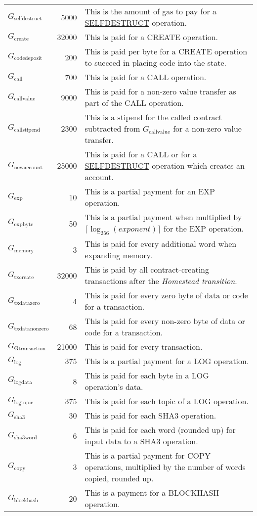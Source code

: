 \documentclass[9pt,oneside]{amsart}
\begin{document}
\begin{tabularx}{\textwidth}{lrX}
$G_{\mathrm{selfdestruct}}$ & 5000 & This is the amount of gas to pay for a \hyperlink{selfdestruct}{\small SELFDESTRUCT} operation. \\
$G_{\mathrm{create}}$ & 32000 & This is paid for a {\small CREATE} operation. \\
$G_{\mathrm{codedeposit}}$ & 200 & This is paid per byte for a {\small CREATE} operation to succeed in placing code into the state. \\
$G_{\mathrm{call}}$ & 700 & This is paid for a {\small CALL} operation. \\
$G_{\mathrm{callvalue}}$ & 9000 & This is paid for a non-zero value transfer as part of the {\small CALL} operation. \\
$G_{\mathrm{callstipend}}$ & 2300 & This is a stipend for the called contract subtracted from $G_{\mathrm{callvalue}}$ for a non-zero value transfer. \hypertarget{Gnewaccount}{}\\
$G_{\mathrm{newaccount}}$ & 25000 & This is paid for a {\small CALL} or for a \hyperlink{selfdestruct}{\small SELFDESTRUCT} operation which creates an account. \\
$G_{\mathrm{exp}}$ & 10 & This is a partial payment for an {\small EXP} operation. \\
$G_{\mathrm{expbyte}}$ & 50 & This is a partial payment when multiplied by $\lceil\log_{256}(exponent)\rceil$ for the {\small EXP} operation. \\
$G_{\mathrm{memory}}$ & 3 & This is paid for every additional word when expanding memory. \hypertarget{Gtxcreate}{\\
$G_{\mathrm{txcreate}}$ & 32000 & This is paid by all contract-creating transactions after the {\it Homestead transition}.}\hypertarget{Gtxdatazero}{\\
$G_{\mathrm{txdatazero}}$ & 4 & This is paid for every zero byte of data or code for a transaction.}\hypertarget{Gtxdatanonzero}{ \\
$G_{\mathrm{txdatanonzero}}$ & 68 & This is paid for every non-zero byte of data or code for a transaction.}\hypertarget{Gtransaction}{ \\
$G_{\mathrm{Gtransaction}}$ & 21000 & This is paid for every transaction.} \\
$G_{\mathrm{log}}$ & 375 & This is a partial payment for a {\small LOG} operation. \\
$G_{\mathrm{logdata}}$ & 8 & This is paid for each byte in a {\small LOG} operation's data. \\
$G_{\mathrm{logtopic}}$ & 375 & This is paid for each topic of a {\small LOG} operation. \\
$G_{\mathrm{sha3}}$ & 30 & This is paid for each {\small SHA3} operation. \\
$G_{\mathrm{sha3word}}$ & 6 & This is paid for each word (rounded up) for input data to a {\small SHA3} operation. \\
$G_{\mathrm{copy}}$ & 3 & This is a partial payment for {\small *COPY} operations, multiplied by the number of words copied, rounded up. \\
$G_{\mathrm{blockhash}}$ & 20 & This is a payment for a {\small BLOCKHASH} operation. \\


\end{tabularx}
\end{document}
